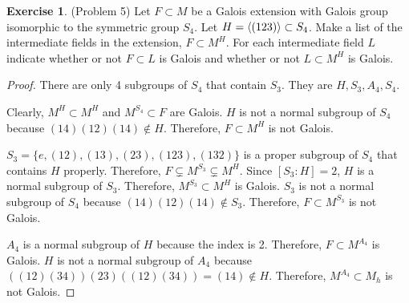 \documentclass[12pt, psamsfonts]{amsart}
\theoremstyle{definition}
\newtheorem*{exer}{Exercise}
\theoremstyle{remark}
\numberwithin{equation}{section}
\begin{document}
\begin{exer}{(Problem 5)}
  Let $F \subset M$ be a Galois extension with Galois group isomorphic to the symmetric group $S_4$.
  Let $H = \ev{(123)} \subset S_4$.
  Make a list of the intermediate fields in the extension, $F \subset M^H$.
  For each intermediate field $L$ indicate whether or not $F \subset L$ is Galois and whether or not $L \subset M^H$ is Galois.
\end{exer}

\begin{proof}
  There are only 4 subgroups of $S_4$ that contain $S_3$.
  They are $H, S_3, A_4, S_4$.

  Clearly, $M^H \subset M^H$ and $M^{S_4} \subset F$ are Galois.
  $H$ is not a normal subgroup of $S_4$ because $(14)(12)(14) \notin H$.
  Therefore, $F \subset M^H$ is not Galois.

  $S_3 = \{ e, (12), (13), (23), (123), (132) \}$ is a proper subgroup of $S_4$ that contains $H$ properly.
  Therefore, $F \subsetneq M^{S_3} \subsetneq M^H$.
  Since $[S_3:H] = 2$, $H$ is a normal subgroup of $S_3$.
  Therefore, $M^{S_3} \subset M^{H}$ is Galois.
  $S_3$ is not a normal subgroup of $S_4$ because $(14)(12)(14) \notin S_3$.
  Therefore, $F \subset M^{S_3}$ is not Galois.

  $A_4$ is a normal subgroup of $H$ because the index is 2.
  Therefore, $F \subset M^{A_4}$ is Galois.
  $H$ is not a normal subgroup of $A_4$ because $((12)(34))(23)((12)(34)) = (14) \notin H$.
  Therefore, $M^{A_4} \subset M_h$ is not Galois.
\end{proof}
\end{document}
